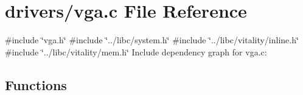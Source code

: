 \hypertarget{a00041}{}\section{drivers/vga.c File Reference}
\label{a00041}
{\ttfamily \#include \char`\"{}vga.\+h\char`\"{}}\newline
{\ttfamily \#include \char`\"{}../libc/system.\+h\char`\"{}}\newline
{\ttfamily \#include \char`\"{}../libc/vitality/inline.\+h\char`\"{}}\newline
{\ttfamily \#include \char`\"{}../libc/vitality/mem.\+h\char`\"{}}\newline
Include dependency graph for vga.\+c\+:
\subsection*{Functions}
